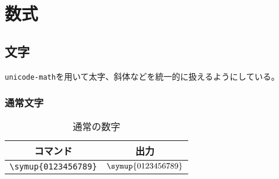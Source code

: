\chapter{数式}

\section{文字}

\verb|unicode-math|を用いて太字、斜体などを統一的に扱えるようにしている。

\subsection{通常文字}

\begin{table}[htbp]
    \centering
    \begin{tabular}{cc}
        \toprule
        コマンド                  & 出力                   \\
        \midrule
        \verb|\symup{0123456789}| & \(\symup{0123456789}\) \\
        \bottomrule
    \end{tabular}
    \caption{通常の数字}
    \label{tab:upright_numbers}
\end{table}

